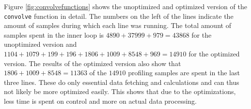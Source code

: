 \documentclass[a4paper]{article}
\begin{document}
Figure \ref{fig:convolvefunctions} shows the unoptimized and optimized version of the \texttt{convolve} function in detail. The numbers on the left of the lines indicate the amount of samples during which each line was running. The total amount of samples spent in the inner loop is $4890 + 37999+ 979 = 43868$ for the unoptimized version and $1104+1079+199+196+1806+1009+8548+969 = 14910$ for the optimized version. The results of the optimized version also show that $1806+1009+8548 = 11363$ of the $14910$ profiling samples are spent in the last three lines. These do only essential data fetching and calculations and can thus not likely be more optimized easily. This shows that due to the optimizations, less time is spent on control and more on actual data processing.\\
\\
\begin{figure}[htpb]
\end{figure}
\end{document}
